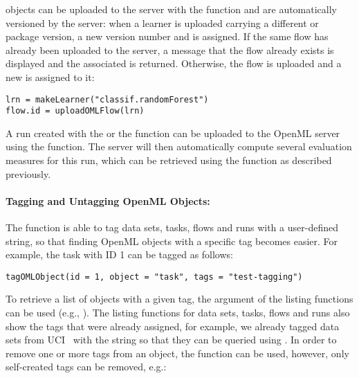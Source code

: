  objects can be uploaded to the server with the  
function and are automatically versioned by the server: when a learner is uploaded carrying
a different  or package version, a new version number and  is assigned.
If the same flow has already been uploaded to the server, a message that the flow already exists is
displayed and the associated  is returned. Otherwise, the flow is uploaded 
and a new  is assigned to it:

\begin{knitrout}\small
{}\color{fgcolor}\begin{kframe}
\begin{verbatim}
lrn = makeLearner("classif.randomForest")
flow.id = uploadOMLFlow(lrn)
\end{verbatim}
\end{kframe}
\end{knitrout}

A run created with the  or the  function can
be uploaded to the OpenML server using the  function. The server
will then automatically compute several evaluation measures for this run, which
can be retrieved using the  function as described previously.

\paragraph{Tagging and Untagging OpenML Objects:}

The  function is able to tag data sets, tasks, flows and
runs with a user-defined string, so that finding OpenML objects with a
specific tag becomes easier. For example, the task with ID 1 can be tagged as follows:

\begin{knitrout}\small
{}\color{fgcolor}\begin{kframe}
\begin{verbatim}
tagOMLObject(id = 1, object = "task", tags = "test-tagging")
\end{verbatim}
\end{kframe}
\end{knitrout}

To retrieve a list of objects with a given tag, the
 argument of the listing functions can be used 
(e.g., ). 
The listing functions for data sets, tasks, flows and runs also show the tags 
that were already assigned, for example, we already tagged data sets from 
UCI~\citep{Asuncion:2007p519} with the string  so that they can be 
queried using .
In order to remove one or more tags from an  object, the
 function can be used, however, only self-created tags can be removed, e.g.:

